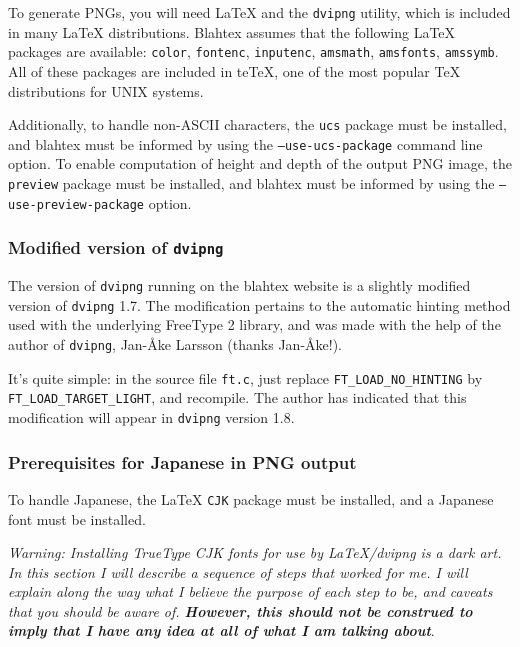 \documentclass{article}
\begin{document}
To generate PNGs, you will need \LaTeX{} and the \texttt{dvipng} utility, which is included in many \LaTeX{} distributions. Blahtex assumes that the following \LaTeX{} packages are available: \texttt{color}, \texttt{fontenc}, \texttt{inputenc}, \texttt{amsmath}, \texttt{amsfonts}, \texttt{amssymb}. All of these packages are included in teTeX, one of the most popular \TeX{} distributions for UNIX systems.

Additionally, to handle non-ASCII characters, the \texttt{ucs} package must be installed, and blahtex must be informed by using the \texttt{--use-ucs-package} command line option. To enable computation of height and depth of the output PNG image, the \texttt{preview} package must be installed, and blahtex must be informed by using the \texttt{--use-preview-package} option. 

\subsubsection{Modified version of \texttt{dvipng}}

The version of \texttt{dvipng} running on the blahtex website is a slightly modified version of \texttt{dvipng} 1.7. The modification pertains to the automatic hinting method used with the underlying FreeType 2 library, and was made with the help of the author of \texttt{dvipng}, Jan-\AA{}ke Larsson (thanks Jan-\AA{}ke!).

It's quite simple: in the source file \texttt{ft.c}, just replace \texttt{FT\_LOAD\_NO\_HINTING} by \texttt{FT\_LOAD\_TARGET\_LIGHT}, and recompile. The author has indicated that this modification will appear in \texttt{dvipng} version 1.8.

\subsubsection{Prerequisites for Japanese in PNG output}\label{sec:howto-japanese}

To handle Japanese, the \LaTeX{} \texttt{CJK} package must be installed, and a Japanese font must be installed.

\emph{Warning: Installing TrueType CJK fonts for use by \LaTeX{}/dvipng is a dark art. In this section I will describe a sequence of steps that worked for me. I will explain along the way what I believe the purpose of each step to be, and caveats that you should be aware of. \textbf{However, this should not be construed to imply that I have any idea at all of what I am talking about}}.
\end{document}
